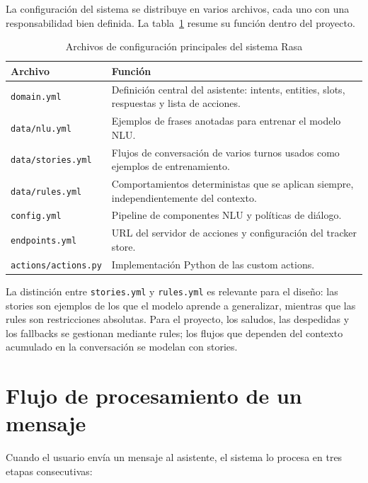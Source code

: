 La configuración del sistema se distribuye en varios archivos, cada uno con una responsabilidad bien definida. La tabla~\ref{tab:archivos-rasa} resume su función dentro del proyecto.

\begin{table}[h]
\centering
\small
\begin{tabular}{|l|p{9cm}|}
\hline
\textbf{Archivo} & \textbf{Función} \\ \hline
\texttt{domain.yml}         & Definición central del asistente: intents, entities, slots, respuestas y lista de acciones. \\ \hline
\texttt{data/nlu.yml}       & Ejemplos de frases anotadas para entrenar el modelo NLU. \\ \hline
\texttt{data/stories.yml}   & Flujos de conversación de varios turnos usados como ejemplos de entrenamiento. \\ \hline
\texttt{data/rules.yml}     & Comportamientos deterministas que se aplican siempre, independientemente del contexto. \\ \hline
\texttt{config.yml}         & Pipeline de componentes NLU y políticas de diálogo. \\ \hline
\texttt{endpoints.yml}      & URL del servidor de acciones y configuración del tracker store. \\ \hline
\texttt{actions/actions.py} & Implementación Python de las custom actions. \\ \hline
\end{tabular}
\caption{Archivos de configuración principales del sistema Rasa}
\label{tab:archivos-rasa}
\end{table}

La distinción entre \texttt{stories.yml} y \texttt{rules.yml} es relevante para el diseño: las stories son ejemplos de los que el modelo aprende a generalizar, mientras que las rules son restricciones absolutas. Para el proyecto, los saludos, las despedidas y los fallbacks se gestionan mediante rules; los flujos que dependen del contexto acumulado en la conversación se modelan con stories.

\section{Flujo de procesamiento de un mensaje}
\label{sec:flujo-procesamiento}

Cuando el usuario envía un mensaje al asistente, el sistema lo procesa en tres etapas consecutivas:

